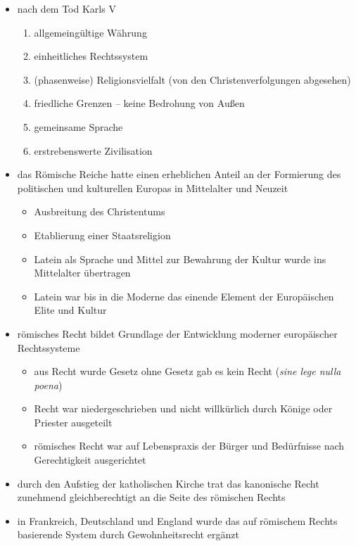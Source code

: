 \documentclass[11pt,a4paper]{article}
\begin{document}
\begin{itemize}
\item nach dem Tod Karls V

	\begin{enumerate}
	\item allgemeingültige Währung
	\item einheitliches Rechtssystem
	\item (phasenweise) Religionsvielfalt (von den Christenverfolgungen abgesehen)
	\item friedliche Grenzen -- keine Bedrohung von Außen
	\item gemeinsame Sprache
	\item erstrebenswerte Zivilisation
	\end{enumerate}

\item das Römische Reiche hatte einen erheblichen Anteil an der Formierung des politischen und kulturellen Europas in Mittelalter und Neuzeit


	\begin{itemize}
	\item Ausbreitung des Christentums
	\item Etablierung einer Staatsreligion
	\item Latein als Sprache und Mittel zur Bewahrung der Kultur wurde ins Mittelalter übertragen
	\item Latein war bis in die Moderne das einende Element der Europäischen Elite und Kultur
	\end{itemize}

\item römisches Recht bildet Grundlage der Entwicklung moderner europäischer Rechtssysteme

	\begin{itemize}
	\item aus Recht wurde Gesetz
	 ohne Gesetz gab es kein Recht (\textsl{sine lege nulla poena})
	\item Recht war niedergeschrieben und nicht willkürlich durch Könige oder Priester ausgeteilt
	\item römisches Recht war auf Lebenspraxis der Bürger und Bedürfnisse nach Gerechtigkeit ausgerichtet
	\end{itemize}

\item durch den Aufstieg der katholischen Kirche trat das kanonische Recht zunehmend gleichberechtigt an die Seite des römischen Rechts

\item in Frankreich, Deutschland und England wurde das auf römischem Rechts basierende System durch Gewohnheitsrecht ergänzt


\end{itemize}
\end{document}
